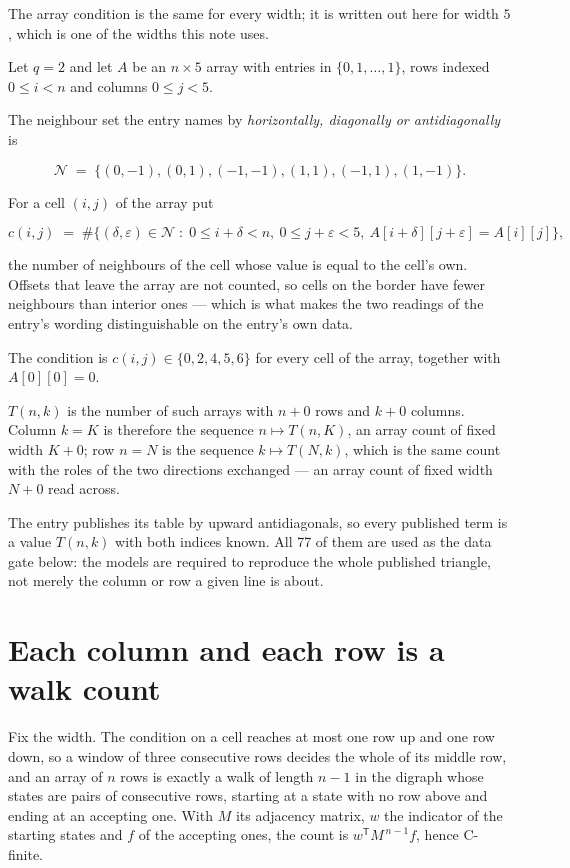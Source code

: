 \documentclass[11pt]{article}
\theoremstyle{definition}
\begin{document}
The array condition is the same for every width; it is written out here for width $5$, which is one of the widths this note uses.

Let $q = 2$ and let $A$ be an $n \times 5$ array with entries in $\{0,1,\dots,1\}$, rows indexed $0 \le i < n$ and columns $0 \le j < 5$.

The neighbour set the entry names by {\itshape horizontally, diagonally or antidiagonally} is

\[\mathcal{N} \;=\; \{(0,-1), (0,1), (-1,-1), (1,1), (-1,1), (1,-1)\}.\]

For a cell $(i,j)$ of the array put

\[c(i,j) \;=\; \#\bigl\{(\delta,\varepsilon)\in\mathcal{N} \;:\; 0\le i+\delta<n,\ 0\le j+\varepsilon<5,\ A[i+\delta][j+\varepsilon] = A[i][j]\bigr\},\]

the number of neighbours of the cell whose value is equal to the cell's own. Offsets that leave the array are not counted, so cells on the border have fewer neighbours than interior ones --- which is what makes the two readings of the entry's wording distinguishable on the entry's own data.

The condition is $c(i,j) \in \{0, 2, 4, 5, 6\}$ for every cell of the array, together with $A[0][0]=0$.

$T(n,k)$ is the number of such arrays with $n + 0$ rows and $k + 0$ columns. Column $k = K$ is therefore the sequence $n \mapsto T(n,K)$, an array count of fixed width $K + 0$; row $n = N$ is the sequence $k \mapsto T(N,k)$, which is the same count with the roles of the two directions exchanged --- an array count of fixed width $N + 0$ read across.

The entry publishes its table by upward antidiagonals, so every published term is a value $T(n,k)$ with both indices known. All 77 of them are used as the data gate below: the models are required to reproduce the whole published triangle, not merely the column or row a given line is about.

\section{Each column and each row is a walk count}

Fix the width. The condition on a cell reaches at most one row up and one row down, so a window of three consecutive rows decides the whole of its middle row, and an array of $n$ rows is exactly a walk of length $n-1$ in the digraph whose states are pairs of consecutive rows, starting at a state with no row above and ending at an accepting one. With $M$ its adjacency matrix, $w$ the indicator of the starting states and $f$ of the accepting ones, the count is $w^{\mathsf T}M^{\,n-1}f$, hence C-finite.
\end{document}
